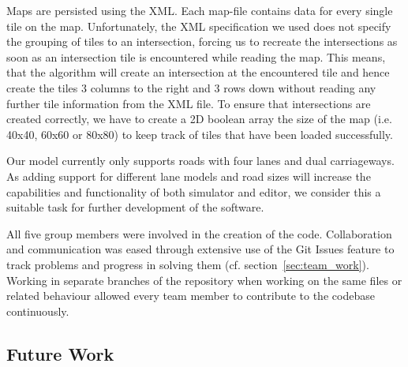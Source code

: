 Maps are persisted using the XML. Each map-file contains data for every single tile on the map. Unfortunately, the XML specification we used does not specify the grouping of tiles to an intersection, forcing us to recreate the intersections as soon as an intersection tile is encountered while reading the map. This means, that the algorithm will create an intersection at the encountered tile and hence create the tiles 3 columns to the right and 3 rows down without reading any further tile information from the XML file. To ensure that intersections are created correctly, we have to create a 2D boolean array the size of the map (i.e. 40x40, 60x60 or 80x80) to keep track of tiles that have been loaded successfully. 

Our model currently only supports roads with four lanes and dual carriageways. As adding support for different lane models and road sizes will increase the capabilities and functionality of both simulator and editor, we consider this a suitable task for further development of the software. 

All five group members were involved in the creation of the code. Collaboration and communication was eased through extensive use of the Git Issues feature to track problems and progress in solving them (cf. section~\ref{sec:team_work}). Working in separate branches of the repository when working on the same files or related behaviour allowed every team member to contribute to the codebase continuously.  

\subsection{Future Work}
